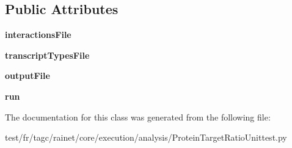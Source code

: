 \subsection*{Public Attributes}
\begin{DoxyCompactItemize}
\item 
\hypertarget{classanalysis_1_1ProteinTargetRatioUnittest_1_1ProteinTargetRatioUnittest_a2d46aa468d1f90ee6b23bbfe16fb03b9}{{\bfseries interactions\-File}}\label{classanalysis_1_1ProteinTargetRatioUnittest_1_1ProteinTargetRatioUnittest_a2d46aa468d1f90ee6b23bbfe16fb03b9}

\item 
\hypertarget{classanalysis_1_1ProteinTargetRatioUnittest_1_1ProteinTargetRatioUnittest_a0e2e4dff47d4ec9067ccb026488d3bbb}{{\bfseries transcript\-Types\-File}}\label{classanalysis_1_1ProteinTargetRatioUnittest_1_1ProteinTargetRatioUnittest_a0e2e4dff47d4ec9067ccb026488d3bbb}

\item 
\hypertarget{classanalysis_1_1ProteinTargetRatioUnittest_1_1ProteinTargetRatioUnittest_ae7e13c3241d5a46c4ca867ed69b2eadc}{{\bfseries output\-File}}\label{classanalysis_1_1ProteinTargetRatioUnittest_1_1ProteinTargetRatioUnittest_ae7e13c3241d5a46c4ca867ed69b2eadc}

\item 
\hypertarget{classanalysis_1_1ProteinTargetRatioUnittest_1_1ProteinTargetRatioUnittest_ad42a9e02da774e9bf993d6c234d79462}{{\bfseries run}}\label{classanalysis_1_1ProteinTargetRatioUnittest_1_1ProteinTargetRatioUnittest_ad42a9e02da774e9bf993d6c234d79462}

\end{DoxyCompactItemize}


The documentation for this class was generated from the following file\-:\begin{DoxyCompactItemize}
\item 
test/fr/tagc/rainet/core/execution/analysis/Protein\-Target\-Ratio\-Unittest.\-py\end{DoxyCompactItemize}
